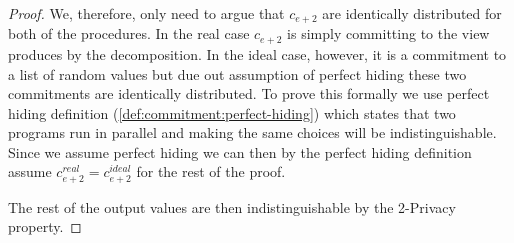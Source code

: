 \begin{proof}
  We, therefore, only need to argue that $c_{e+2}$ are identically distributed
  for both of the procedures. In the real case $c_{e+2}$ is simply committing to
  the view produces by the decomposition. In the ideal case, however, it is a
  commitment to a list of random values but due out assumption of perfect hiding
  these two commitments are identically distributed.
  To prove this formally we use perfect hiding definition
  (\ref{def:commitment:perfect-hiding}) which states that two programs run in
  parallel and making the same choices will be indistinguishable. Since we
  assume perfect hiding we can then by the perfect hiding definition assume
  $c^{real}_{e+2} = c^{ideal}_{e+2}$ for the rest of the proof.

  The rest of the output values are then indistinguishable by the 2-Privacy property.
\end{proof}

